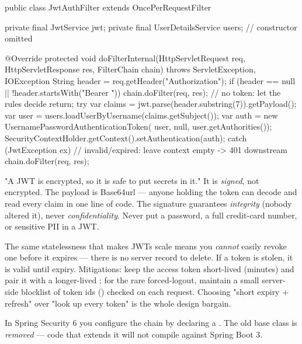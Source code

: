 \begin{javabox}
public class JwtAuthFilter extends OncePerRequestFilter {
  private final JwtService jwt;
  private final UserDetailsService users;
  // constructor omitted

  @Override
  protected void doFilterInternal(HttpServletRequest req,
      HttpServletResponse res, FilterChain chain)
      throws ServletException, IOException {
    String header = req.getHeader("Authorization");
    if (header == null || !header.startsWith("Bearer ")) {
      chain.doFilter(req, res);   // no token: let the rules decide
      return;
    }
    try {
      var claims = jwt.parse(header.substring(7)).getPayload();
      var user = users.loadUserByUsername(claims.getSubject());
      var auth = new UsernamePasswordAuthenticationToken(
          user, null, user.getAuthorities());
      SecurityContextHolder.getContext().setAuthentication(auth);
    } catch (JwtException ex) {
      // invalid/expired: leave context empty -> 401 downstream
    }
    chain.doFilter(req, res);
  }
}
\end{javabox}

\begin{misconception}
"A JWT is encrypted, so it is safe to put secrets in it." It is \emph{signed}, not encrypted. The payload is Base64url --- anyone holding the token can decode and read every claim in one line of code. The signature guarantees \emph{integrity} (nobody altered it), never \emph{confidentiality}. Never put a password, a full credit-card number, or sensitive PII in a JWT.
\end{misconception}

\begin{secwarn}
The same statelessness that makes JWTs scale means you \emph{cannot} easily revoke one before it expires --- there is no server record to delete. If a token is stolen, it is valid until expiry. Mitigations: keep the access token short-lived (minutes) and pair it with a longer-lived ; for the rare forced-logout, maintain a small server-side blocklist of token ids () checked on each request. Choosing "short expiry + refresh" over "look up every token" is the whole design bargain.
\end{secwarn}


 In Spring Security 6 you configure the chain by declaring a  . The old  base class is \emph{removed} --- code that extends it will not compile against Spring Boot 3.

